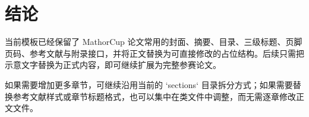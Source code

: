 \section{结论}

当前模板已经保留了 MathorCup 论文常用的封面、摘要、目录、三级标题、页脚页码、参考文献与附录接口，并将正文替换为可直接修改的占位结构。后续只需把示意文字替换为正式内容，即可继续扩展为完整参赛论文。

如果需要增加更多章节，可继续沿用当前的 `sections` 目录拆分方式；如果需要替换参考文献样式或章节标题格式，也可以集中在类文件中调整，而无需逐章修改正文文件。
